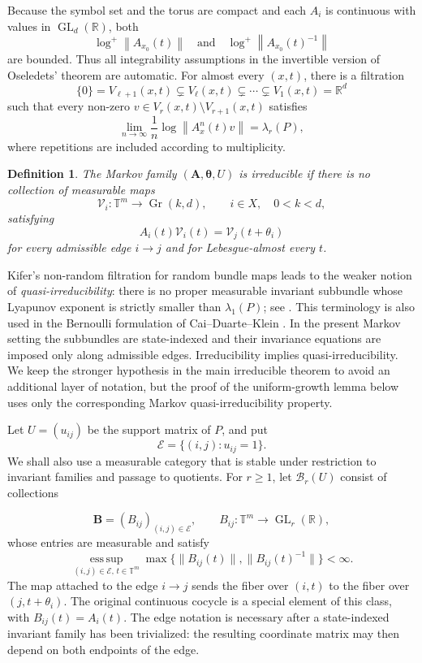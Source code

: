 \documentclass[11pt,a4paper]{amsart}
\newtheorem{definition}[theorem]{Definition}
\newcommand{\T}{\mathbb T}
\newcommand{\R}{\mathbb R}
\newcommand{\Gr}{\operatorname{Gr}}
\newcommand{\cE}{\mathcal E}
\newcommand{\norm}[1]{\left\lVert #1\right\rVert}
\begin{document}
Because the symbol set and the torus are compact and each \(A_i\) is
continuous with values in \(\operatorname{GL}_d(\R)\), both
\[
 \log^+\norm{A_{x_0}(t)}
 \quad\text{and}\quad
 \log^+\norm{A_{x_0}(t)^{-1}}
\]
are bounded.  Thus all integrability assumptions in the invertible
version of Oseledets' theorem are automatic.  For almost every
\((x,t)\), there is a filtration
\[
 \{0\}=V_{\ell+1}(x,t)\subsetneq V_\ell(x,t)
 \subsetneq\cdots\subsetneq V_1(x,t)=\R^d
\]
such that every non-zero
\(v\in V_r(x,t)\setminus V_{r+1}(x,t)\) satisfies
\[
 \lim_{n\to\infty}\frac1n\log\norm{A_x^n(t)v}
 =\lambda_r(P),
\]
where repetitions are included according to multiplicity.
\begin{definition}\label{def:irreducible}
The Markov family
\((\mathbf A,\boldsymbol\theta,U)\) is \emph{irreducible} if there is
no collection of measurable maps
\[
 \mathcal V_i:\T^m\to\Gr(k,d),\qquad i\in X,\quad 0<k<d,
\]
satisfying
\[
 A_i(t)\mathcal V_i(t)=\mathcal V_j(t+\theta_i)
\]
for every admissible edge \(i\to j\) and for
Lebesgue-almost every \(t\).
\end{definition}

Kifer's non-random filtration for random bundle maps leads to the
weaker notion of \emph{quasi-irreducibility}: there is no proper
measurable invariant subbundle whose Lyapunov exponent is strictly
smaller than \(\lambda_1(P)\); see
\cite[Chapter~III]{Kifer}.  This terminology is also used in the
Bernoulli formulation of Cai--Duarte--Klein
\cite[Definition~3.4]{CDK}.  In the present Markov setting the
subbundles are state-indexed and their invariance equations are
imposed only along admissible edges.  Irreducibility implies
quasi-irreducibility.  We keep the stronger hypothesis in the main
irreducible theorem to avoid an additional layer of notation, but the
proof of the uniform-growth lemma below uses only the corresponding
Markov quasi-irreducibility property.

Let \(U=(u_{ij})\) be the support matrix of \(P\), and put
\[
 \cE=\{(i,j):u_{ij}=1\}.
\]
We shall also use a measurable category that is stable under
restriction to invariant families and passage to quotients.  For
\(r\geq1\), let \(\mathcal B_r(U)\) consist of collections

\[
 \mathbf B=(B_{ij})_{(i,j)\in\cE},
 \qquad
 B_{ij}:\mathbb T^m\longrightarrow\operatorname{GL}_r(\mathbb R),
\]
whose entries are measurable and satisfy
\begin{equation}\label{eq:measurable-bounded-class}
 \operatorname*{ess\,sup}_{(i,j)\in\cE,\,t\in\mathbb T^m}
 \max\bigl\{\|B_{ij}(t)\|,\|B_{ij}(t)^{-1}\|\bigr\}<\infty.
\end{equation}
The map attached to the edge \(i\to j\) sends the fiber over
\((i,t)\) to the fiber over \((j,t+\theta_i)\).  The original
continuous cocycle is a special element of this class, with
\(B_{ij}(t)=A_i(t)\).  The edge notation is necessary after a
state-indexed invariant family has been trivialized: the resulting
coordinate matrix may then depend on both endpoints of the edge.
\end{document}
